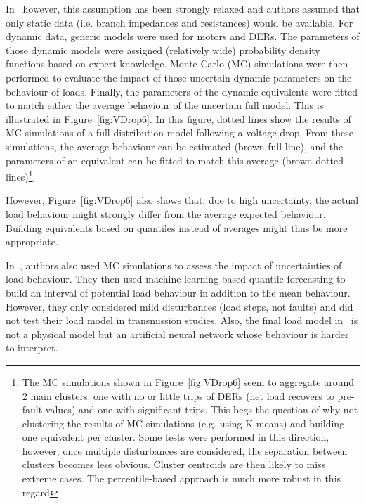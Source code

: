 In~\cite{ChaspierrePaper, ChaspierreThesis} however, this assumption has been strongly relaxed and authors assumed that only static data (i.e. branch impedances and resistances) would be available. For dynamic data, generic models were used for motors and DERs. The parameters of those dynamic models were assigned (relatively wide) probability density functions based on expert knowledge. Monte Carlo (MC) simulations were then performed to evaluate the impact of those uncertain dynamic parameters on the behaviour of loads. Finally, the parameters of the dynamic equivalents were fitted to match either the average behaviour of the uncertain full model. This is illustrated in Figure~\ref{fig:VDrop6}. In this figure, dotted lines show the results of MC simulations of a full distribution model following a voltage drop. From these simulations, the average behaviour can be estimated (brown full line), and the parameters of an equivalent can be fitted to match this average (brown dotted lines)\footnote{The MC simulations shown in Figure~\ref{fig:VDrop6} seem to aggregate around 2 main clusters: one with no or little trips of DERs (net load recovers to pre-fault values) and one with significant trips. This begs the question of why not clustering the results of MC simulations (e.g. using K-means) and building one equivalent per cluster. Some tests were performed in this direction, however, once multiple disturbances are considered, the separation between clusters becomes less obvious. Cluster centroids are then likely to miss extreme cases. The percentile-based approach is much more robust in this regard}.

However, Figure~\ref{fig:VDrop6} also shows that, due to high uncertainty, the actual load behaviour might strongly differ from the average expected behaviour. Building equivalents based on quantiles instead of averages might thus be more appropriate.

In~\cite{Vorwerk}, authors also used MC simulations to assess the impact of uncertainties of load behaviour. They then used machine-learning-based quantile forecasting to build an interval of potential load behaviour in addition to the mean behaviour. However, they only considered mild disturbances (load steps, not faults) and did not test their load model in transmission studies. Also, the final load model in~\cite{Vorwerk} is not a physical model but an artificial neural network whose behaviour is harder to interpret.

